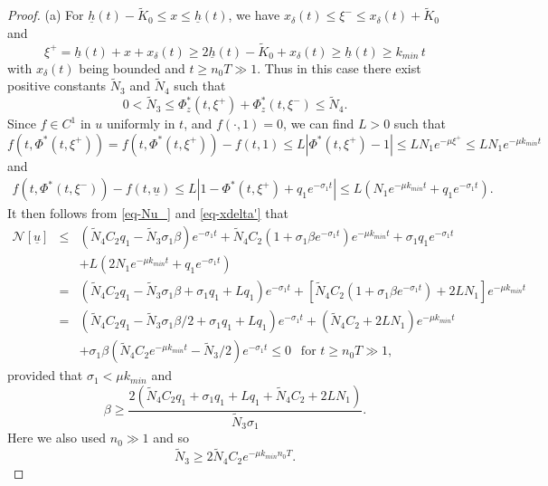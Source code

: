 \documentclass[11pt]{amsart}
\numberwithin{equation}{section}
\begin{document}
\begin{proof}
(a) For $\underline{h}(t)-\tilde{K}_0\leq x\leq \underline{h}(t)$, we have $x_\delta(t)\leq \xi^-\leq x_\delta(t)+\tilde{K}_0$  and
\begin{equation*}
  \xi^+=\underline{h}(t)+x+x_\delta(t)\geq 2\underline{h}(t)-\tilde{K}_0+x_\delta(t)\geq \underline{h}(t)\geq k_{min}\, t
\end{equation*}
with $x_\delta(t)$ being bounded and $t\geq n_0T\gg 1$.
Thus in this case there exist positive constants $\tilde{N}_3$ and $\tilde{N}_4$ such that 
\begin{equation*}
 0< \tilde{N}_3\leq\Phi^*_z(t,\xi^+)+\Phi^*_z(t,\xi^-)\leq \tilde{N}_4.
\end{equation*}
Since $f\in C^1$ in $u$ uniformly in $t$, and $f(\cdot,1)=0$, 
we can find $L>0$ such that
\begin{equation*}
  f(t,\Phi^*(t,\xi^+))= f(t,\Phi^*(t,\xi^+))-f(t,1)\leq L|\Phi^*(t,\xi^+)-1|\leq LN_1e^{-\mu\xi^+} \leq LN_1 e^{-\mu  k_{min}t}
\end{equation*}
and
\begin{eqnarray*}
  f(t,\Phi^*(t,\xi^-))-f(t,\underline{u})\leq L|1-\Phi^*(t,\xi^+)+q_1e^{-\sigma_1t}|\leq L(N_1 e^{-\mu  k_{min}t}+q_1e^{-\sigma_1t}).
\end{eqnarray*}
 It then follows from \eqref{eq-Nu_} and \eqref{eq-xdelta'} that 
\begin{eqnarray*}
  \mathcal{N}[\underline{u}]&\leq&(\tilde{N}_4C_2q_1-\tilde{N}_3\sigma_1\beta) e^{-\sigma_1t}+\tilde{N}_4C_2 (1+\sigma_1\beta  e^{-\sigma_1t})e^{-\mu  k_{min}t}+\sigma_1q_1 e^{-\sigma_1t}\\
  && +L(2N_1 e^{-\mu  k_{min}t}+q_1e^{-\sigma_1t})\\
  &=&\left(\tilde{N}_4C_2q_1-\tilde{N}_3\sigma_1\beta+\sigma_1q_1  +Lq_1\right) e^{-\sigma_1t}+[\tilde{N}_4C_2(1+\sigma_1\beta  e^{-\sigma_1t} )+2LN_1] e^{-\mu  k_{min}t}\\
  &=& \left(\tilde{N}_4C_2q_1-\tilde{N}_3\sigma_1\beta/2+\sigma_1q_1  +Lq_1\right) e^{-\sigma_1t}+(\tilde{N}_4C_2+2LN_1) e^{-\mu  k_{min}t}\\
  &&+\sigma_1\beta(\tilde{N}_4C_2 e^{-\mu  k_{min}t}-\tilde{N}_3 /2)e^{-\sigma_1t}\leq 0 ~~\text{ for }t\geq  n_0T\gg1,
\end{eqnarray*}
provided that $\sigma_1<\mu k_{min}$ and
\begin{equation*}
  \beta\geq \frac{2(\tilde{N}_4C_2q_1+\sigma_1q_1+Lq_1+\tilde{N}_4C_2+2LN_1)}{\tilde{N}_3\sigma_1}.
\end{equation*} 
Here we also used $ n_0\gg 1$ and so 
\begin{equation*}
  \tilde{N}_3\geq 2\tilde{N}_4C_2 e^{-\mu k_{min} n_0T}.
\end{equation*}



\end{proof}
\end{document}
